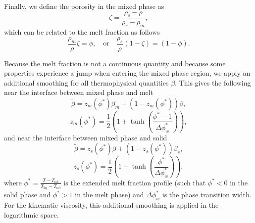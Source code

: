 \documentclass{article}
\begin{document}
Finally, we define the porosity in the mixed phase as
\begin{equation}
    \zeta = \frac{\rho_s-\rho}{\rho_s-\rho_m},
\end{equation}
which can be related to the melt fraction as follows
\begin{equation}
    \frac{\rho_m}{\rho}\zeta = \phi, \quad \mathrm{or} \quad \frac{\rho_s}{\rho}(1-\zeta) = (1-\phi).
\end{equation}

Because the melt fraction is not a continuous quantity and because some properties experience a jump when entering the mixed phase region, we apply an additional smoothing for all thermophysical quantities $\beta$. This gives the following near the interface between mixed phase and melt
\begin{equation}
    \widetilde{\beta} = z_m(\phi^*)\beta_m + (1-z_m(\phi^*))\beta,
\end{equation}
\begin{equation}
z_m(\phi^*)=\frac{1}{2}\left(1+\tanh\left( \frac{\phi^*-1}{\Delta\phi_w^*}\right) \right),
\end{equation}
and near the interface between mixed phase and solid
\begin{equation}
    \widetilde{\beta} = z_s(\phi^*)\beta + (1-z_s(\phi^*))\beta_s,
\end{equation}
\begin{equation}
z_s(\phi^*)=\frac{1}{2}\left(1+\tanh\left( \frac{\phi^*}{\Delta\phi_w^*}\right) \right),
\end{equation}
where $\phi^*= \frac{T-T_\mathrm{sol}}{T_\mathrm{liq}-T_\mathrm{sol}}$ is the extended melt fraction profile (such that $\phi^*<0$ in the solid phase and $\phi^*>1$ in the melt phase) and $\Delta\phi_w^*$ is the phase transition width. For the kinematic viscosity, this additional smoothing is applied in the logarithmic space.
\end{document}
